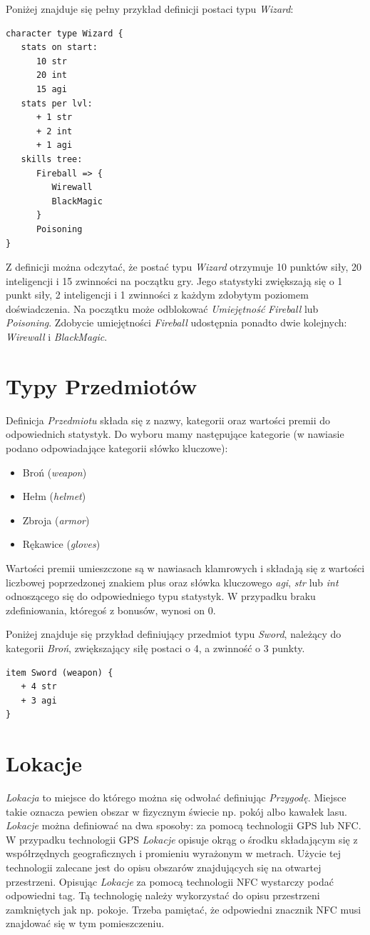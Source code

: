 \documentclass[openright]{xmgr}
\begin{document}
Poniżej znajduje się pełny przykład definicji postaci typu \textit{Wizard}:
\begin{verbatim}
character type Wizard {
   stats on start:
      10 str
      20 int
      15 agi
   stats per lvl:
      + 1 str
      + 2 int
      + 1 agi
   skills tree:
      Fireball => {
         Wirewall
         BlackMagic
      }
      Poisoning
}
\end{verbatim}
Z definicji można odczytać, że postać typu \textit{Wizard} otrzymuje 10 punktów siły, 20 inteligencji i 15 zwinności na początku gry.
Jego statystyki zwiększają się o 1 punkt siły, 2 inteligencji i 1 zwinności z każdym zdobytym poziomem doświadczenia.
Na początku może odblokować \textit{Umiejętność} \textit{Fireball} lub \textit{Poisoning}. Zdobycie umiejętności \textit{Fireball} udostępnia ponadto dwie kolejnych: \textit{Wirewall} i \textit{BlackMagic}. 

\section{Typy Przedmiotów}
Definicja \textit{Przedmiotu} składa się z nazwy, kategorii oraz wartości premii do odpowiednich statystyk. Do wyboru mamy następujące kategorie (w nawiasie podano odpowiadające kategorii słówko kluczowe):
\begin{itemize}
	\item Broń (\textit{weapon})
	\item Hełm (\textit{helmet})
	\item Zbroja (\textit{armor})
	\item Rękawice (\textit{gloves})
\end{itemize}
Wartości premii umieszczone są w nawiasach klamrowych i składają się z wartości liczbowej poprzedzonej znakiem plus oraz słówka kluczowego \textit{agi}, \textit{str} lub \textit{int} odnoszącego się do odpowiedniego typu statystyk. W przypadku braku zdefiniowania, któregoś z bonusów, wynosi on 0.

Poniżej znajduje się przykład definiujący przedmiot typu \textit{Sword}, należący do kategorii \textit{Broń}, zwiększający siłę postaci o 4, a zwinność o 3 punkty.
\begin{verbatim}
item Sword (weapon) {
   + 4 str
   + 3 agi
}
\end{verbatim}

\section{Lokacje}
\textit{Lokacja} to miejsce do którego można się odwołać definiując \textit{Przygodę}. Miejsce takie oznacza pewien obszar w fizycznym świecie np. pokój albo kawałek lasu. \textit{Lokacje} można definiować na dwa sposoby: za pomocą technologii GPS lub NFC. 
W przypadku technologii GPS \textit{Lokacje} opisuje okrąg o środku składającym się z współrzędnych geograficznych i promieniu wyrażonym w metrach. Użycie tej technologii zalecane jest do opisu obszarów znajdujących się na otwartej przestrzeni.
Opisując \textit{Lokacje} za pomocą technologii NFC wystarczy podać odpowiedni tag. Tą technologię należy wykorzystać do opisu przestrzeni zamkniętych jak np. pokoje. Trzeba pamiętać, że odpowiedni znacznik NFC musi znajdować się w tym pomieszczeniu.
\end{document}
